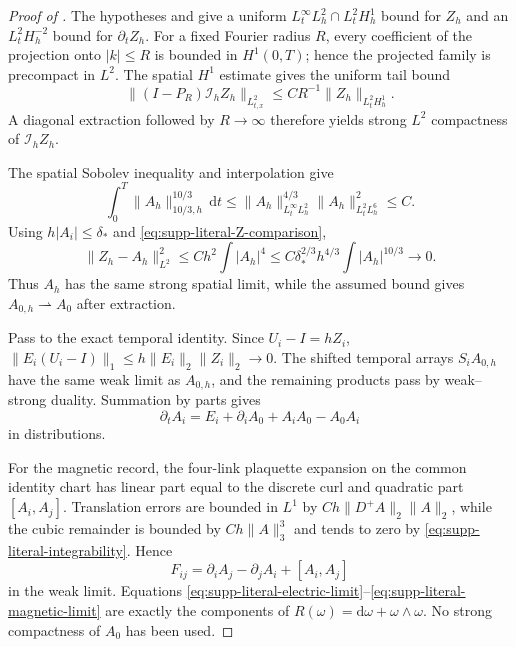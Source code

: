 \documentclass[11pt]{article}
\numberwithin{equation}{section}
\theoremstyle{definition}
\theoremstyle{remark}
\newcommand{\dd}{\mathrm d}
\begin{document}
\begin{proof}[Proof of ]
The hypotheses and  give a uniform
$L_t^\infty L_h^2\cap L_t^2H_h^1$ bound for $Z_h$ and an
$L_t^2H_h^{-2}$ bound for $\partial_tZ_h$.  For a fixed Fourier radius
$R$, every coefficient of the projection onto $|k|\le R$ is bounded in
$H^1(0,T)$; hence the projected family is precompact in $L^2$.  The spatial
$H^1$ estimate gives the uniform tail bound
\begin{equation}
 \|(I-P_R)\mathcal I_hZ_h\|_{L^2_{t,x}}
 \le CR^{-1}\|Z_h\|_{L_t^2H_h^1}.
 \label{eq:supp-literal-Fourier-tail}
\end{equation}
A diagonal extraction followed by $R\to\infty$ therefore yields strong
$L^2$ compactness of $\mathcal I_hZ_h$.

The spatial Sobolev inequality and interpolation give
\begin{equation}
 \int_0^T\|A_h\|_{10/3,h}^{10/3}\,\dd t
 \le \|A_h\|_{L_t^\infty L_h^2}^{4/3}
      \|A_h\|_{L_t^2L_h^6}^{2}\le C.
 \label{eq:supp-literal-integrability}
\end{equation}
Using $h|A_i|\le\delta_*$ and
\eqref{eq:supp-literal-Z-comparison},
\begin{equation}
 \|Z_h-A_h\|_{L^2}^2
 \le Ch^2\int|A_h|^4
 \le C\delta_*^{2/3}h^{4/3}\int|A_h|^{10/3}
 \longrightarrow0.
 \label{eq:supp-literal-log-error}
\end{equation}
Thus $A_h$ has the same strong spatial limit, while the assumed bound gives
$A_{0,h}\rightharpoonup A_0$ after extraction.

Pass to the exact temporal identity.  Since $U_i-I=hZ_i$,
$\|E_i(U_i-I)\|_1\le h\|E_i\|_2\|Z_i\|_2\to0$.
The shifted temporal arrays $S_iA_{0,h}$ have the same weak limit as
$A_{0,h}$, and the remaining products pass by weak--strong duality.
Summation by parts gives
\begin{equation}
 \partial_tA_i
 =E_i+\partial_iA_0+A_iA_0-A_0A_i
 \label{eq:supp-literal-electric-limit}
\end{equation}
in distributions.

For the magnetic record, the four-link plaquette expansion on the common
identity chart has linear part equal to the discrete curl and quadratic part
$[A_i,A_j]$.  Translation errors are bounded in $L^1$ by
$Ch\|D^+A\|_2\|A\|_2$, while the cubic remainder is bounded by
$Ch\|A\|_3^3$ and tends to zero by
\eqref{eq:supp-literal-integrability}.  Hence
\begin{equation}
 F_{ij}=\partial_iA_j-\partial_jA_i+[A_i,A_j]
 \label{eq:supp-literal-magnetic-limit}
\end{equation}
in the weak limit.  Equations
\eqref{eq:supp-literal-electric-limit}--\eqref{eq:supp-literal-magnetic-limit}
are exactly the components of
$R(\omega)=\dd\omega+\omega\wedge\omega$.  No strong compactness of
$A_0$ has been used.
\end{proof}
\end{document}
